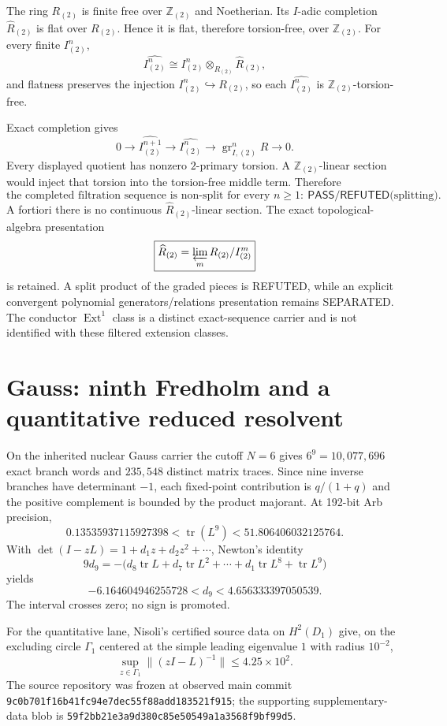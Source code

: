 \documentclass[9.5pt,a4paper]{article}
\newcommand{\PASS}{\textsf{PASS}}\newcommand{\ZERO}{\textsf{ZERO}}\newcommand{\SEP}{\textsf{SEPARATED}}\newcommand{\REF}{\textsf{REFUTED}}\newcommand{\NT}{\textsf{NT}}
\begin{document}
The ring $R_{(2)}$ is finite free over $\mathbb Z_{(2)}$ and Noetherian.  Its $I$-adic completion $\widehat R_{(2)}$ is flat over $R_{(2)}$.  Hence it is flat, therefore torsion-free, over $\mathbb Z_{(2)}$.  For every finite $I^n_{(2)}$,
\[
\widehat{I^n_{(2)}}\cong I^n_{(2)}\otimes_{R_{(2)}}\widehat R_{(2)},
\]
and flatness preserves the injection $I^n_{(2)}\hookrightarrow R_{(2)}$, so each $\widehat{I^n_{(2)}}$ is $\mathbb Z_{(2)}$-torsion-free.

Exact completion gives
\[
0\longrightarrow\widehat{I^{n+1}_{(2)}}\longrightarrow\widehat{I^n_{(2)}}
\longrightarrow\operatorname{gr}^n_{I,(2)}R\longrightarrow0.
\]
Every displayed quotient has nonzero $2$-primary torsion.  A $\mathbb Z_{(2)}$-linear section would inject that torsion into the torsion-free middle term.  Therefore
\[
\boxed{\text{the completed filtration sequence is non-split for every }n\ge1:\ \PASS/\REF\text{(splitting)}.}
\]
A fortiori there is no continuous $\widehat R_{(2)}$-linear section.  The exact topological-algebra presentation
\[
\boxed{\widehat R_{(2)}=\varprojlim_m R_{(2)}/I^m_{(2)}}
\]
is retained.  A split product of the graded pieces is \REF{}, while an explicit convergent polynomial generators/relations presentation remains \SEP.  The conductor $\operatorname{Ext}^1$ class is a distinct exact-sequence carrier and is not identified with these filtered extension classes.

\section{Gauss: ninth Fredholm and a quantitative reduced resolvent}
On the inherited nuclear Gauss carrier the cutoff $N=6$ gives $6^9=10{,}077{,}696$ exact branch words and $235{,}548$ distinct matrix traces.  Since nine inverse branches have determinant $-1$, each fixed-point contribution is $q/(1+q)$ and the positive complement is bounded by the product majorant.  At 192-bit Arb precision,
\[
\boxed{0.13535937115927398<\operatorname{tr}(L^9)<51.806406032125764.}
\]
With $\det(I-zL)=1+d_1z+d_2z^2+\cdots$, Newton's identity
\[
9d_9=-\bigl(d_8\operatorname{tr}L+d_7\operatorname{tr}L^2+\cdots+d_1\operatorname{tr}L^8+\operatorname{tr}L^9\bigr)
\]
yields
\[
\boxed{-6.164604946255728<d_9<4.656333397050539.}
\]
The interval crosses zero; no sign is promoted.

For the quantitative lane, Nisoli's certified source data on $H^2(D_1)$ give, on the excluding circle $\Gamma_1$ centered at the simple leading eigenvalue $1$ with radius $10^{-2}$,
\[
\boxed{\sup_{z\in\Gamma_1}\|(zI-L)^{-1}\|\le4.25\times10^2.}
\]
The source repository was frozen at observed main commit \texttt{9c0b701f16b41fc94e7dec55f88add183521f915}; the supporting supplementary-data blob is \texttt{59f2bb21e3a9d380c85e50549a1a3568f9bf99d5}.
\end{document}
